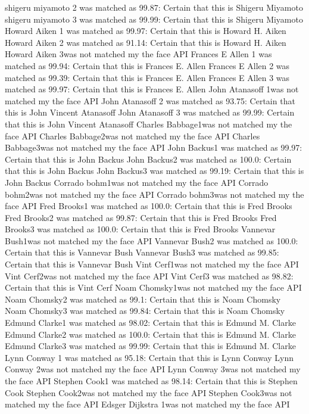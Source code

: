 \documentclass[12pt,a4paper]{article}
\begin{document}
\begin{appendices}
shigeru miyamoto 2 was matched as 99.87: Certain that this is Shigeru Miyamoto
shigeru miyamoto 3 was matched as 99.99: Certain that this is Shigeru Miyamoto
Howard Aiken 1 was matched as 99.97: Certain that this is Howard H. Aiken
Howard Aiken 2 was matched as 91.14: Certain that this is Howard H. Aiken
Howard Aiken 3was not matched my the face API
Frances E Allen 1 was matched as 99.94: Certain that this is Frances E. Allen
Frances E Allen 2 was matched as 99.39: Certain that this is Frances E. Allen
Frances E Allen 3 was matched as 99.97: Certain that this is Frances E. Allen
John Atanasoff 1was not matched my the face API
John Atanasoff 2 was matched as 93.75: Certain that this is John Vincent Atanasoff
John Atanasoff 3 was matched as 99.99: Certain that this is John Vincent Atanasoff
Charles Babbage1was not matched my the face API
Charles Babbage2was not matched my the face API
Charles Babbage3was not matched my the face API
John Backus1 was matched as 99.97: Certain that this is John Backus
John Backus2 was matched as 100.0: Certain that this is John Backus
John Backus3 was matched as 99.19: Certain that this is John Backus
Corrado bohm1was not matched my the face API
Corrado bohm2was not matched my the face API
Corrado bohm3was not matched my the face API
Fred Brooks1 was matched as 100.0: Certain that this is Fred Brooks
Fred Brooks2 was matched as 99.87: Certain that this is Fred Brooks
Fred Brooks3 was matched as 100.0: Certain that this is Fred Brooks
Vannevar Bush1was not matched my the face API
Vannevar Bush2 was matched as 100.0: Certain that this is Vannevar Bush
Vannevar Bush3 was matched as 99.85: Certain that this is Vannevar Bush
Vint Cerf1was not matched my the face API
Vint Cerf2was not matched my the face API
Vint Cerf3 was matched as 98.82: Certain that this is Vint Cerf
Noam Chomsky1was not matched my the face API
Noam Chomsky2 was matched as 99.1: Certain that this is Noam Chomsky
Noam Chomsky3 was matched as 99.84: Certain that this is Noam Chomsky
Edmund Clarke1 was matched as 98.02: Certain that this is Edmund M. Clarke
Edmund Clarke2 was matched as 100.0: Certain that this is Edmund M. Clarke
Edmund Clarke3 was matched as 99.99: Certain that this is Edmund M. Clarke
Lynn Conway 1 was matched as 95.18: Certain that this is Lynn Conway
Lynn Conway 2was not matched my the face API
Lynn Conway 3was not matched my the face API
Stephen Cook1 was matched as 98.14: Certain that this is Stephen Cook
Stephen Cook2was not matched my the face API
Stephen Cook3was not matched my the face API
Edsger Dijkstra 1was not matched my the face API

\end{appendices}
\end{document}
